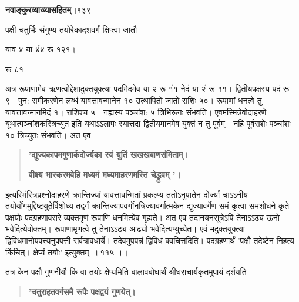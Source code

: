 \documentclass[11pt, openany]{book}
\begin{document}
\onehalfspacing
\hspace{2in}\textbf{नवाङ्कुरव्याख्यासहितम्।}\hspace{2in}१३९

\vspace{5mm}

\begin{sloppypar}
\hangindent=0.2in पक्षी चतुर्भिः संगुण्य तयोरेकादशवर्गं क्षिप्त्वा जातौ

\hspace{1.5in}याव ४ या ४ं४ रू १२१।

\hspace{2.5in}रू ८१


\hangindent=0.2in \hspace{0.2in}अत्र रूपाणामेव ऋणत्वोद्देशादुक्तयुक्त्या पदमिदमेव या २ रू १ं१ नेदं या २ं रू ११। द्वितीयपक्षस्य पदं रू ९। पुन: समीकरणेन लब्धं यावत्तावन्मानेन १० उत्थापितो जातो राशिः ५०। रूपाणां धनत्वे तु यावत्तावन्मानमिदं १। राशिश्च ५। नह्यस्य पञ्चांश: ५ त्रिभिरूनः संभवति। एवमस्मिन्नेवोदाहरणे यूथात्पञ्चांशकस्त्रिच्युत इति यथाऽऽलापः स्यात्तदा द्वितीयमानमेव युक्तं न तु पूर्वम्। नहि पूर्वराशेः पञ्चांशः १० त्रिच्युतः संभवति। अत एव\textendash

\begin{quote}
\hspace{0.5in}\textbf{'द्युज्यकापमगुणार्कदोर्ज्यका स्वं युतिं खखखबाणसंमिताम्}।

\hspace{0.5in}\textbf{वीक्ष्य भास्करमवेहि मध्यमं मध्यमाहरणमस्ति चेद्ध्रुवम् '।}
\end{quote}

\hangindent=0.2in \hspace{0.2in}इत्यस्मिंस्त्रिप्रश्नोदाहरणे क्रान्तिज्यां यावत्तावन्मितां प्रकल्प्य ततोऽनुपातेन दोर्ज्यां चाऽऽनीय तयोर्योगमुद्दिष्टयुतेर्विशोध्य तद्वर्गं क्रान्तिज्यापवर्गोनत्रिज्यावर्गात्मकेन द्युज्यावर्गेण समं कृत्वा समशोधने कृते पक्षयोः पदग्रहणावसरे व्यक्तमृणं रूपाणि धनमित्येव गृह्यते। अत एव तदानयनसूत्रेऽपि तेनाऽऽढ्य ऊनो भवेदित्येवोक्तम्। रूपाणामृणत्वे तु तेनाऽऽढ्य आढ्यो भवेदित्यप्युच्येत। एवं मदुक्तयुक्त्या द्विविधमानोपपत्त्यनुपपत्ती सर्वत्रावधार्ये। तदेवमुपपन्नं द्विविधं क्वचित्तदिति। पदग्रहणार्थं 'पक्षौ तदेष्टेन निहत्य किंचित्। क्षेप्यं तयोः' इत्युक्तम् ॥ ११५ ।।

\hangindent=0.2in \hspace{0.2in}तत्र केन पक्षौ गुणनीयौ किं वा तयोः क्षेप्यमिति बालावबोधार्थं श्रीधराचार्यकृतमुपायं दर्शयति\textendash

\begin{quote}
\hspace{1in}\textbf{'चतुराहतवर्गसमै रूपैः पक्षद्वयं गुणयेत्।}


\end{quote}
\end{sloppypar}
\end{document}

